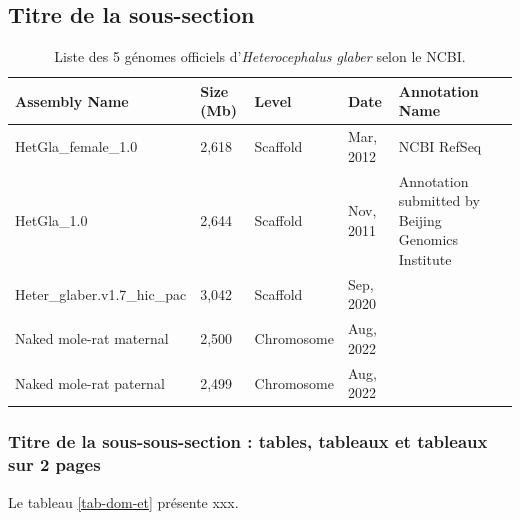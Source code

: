 \subsection{Titre de la sous-section}
\label{ajout-du-label-pour-faire-reference-a-la-sous-section}
 


\begin{table}[tb]%
    \raggedleft
    \caption{Liste des 5 génomes officiels d'\textit{Heterocephalus glaber} selon le NCBI.}
    \begin{tabular}{llllp{4cm}}
    \hline \hline
        \textbf{Assembly Name} & \textbf{Size (Mb)} & \textbf{Level} & \textbf{Date} & \textbf{Annotation Name} \\ \hline
        HetGla\_female\_1.0 & 2,618 & Scaffold & Mar, 2012 & NCBI RefSeq \\ \hline
       HetGla\_1.0 & 2,644 & Scaffold & Nov, 2011 & Annotation submitted by Beijing Genomics Institute \\ \hline
      Heter\_glaber.v1.7\_hic\_pac & 3,042 & Scaffold & Sep, 2020 & ~ \\ \hline
        Naked mole-rat maternal & 2,500 & Chromosome & Aug, 2022 & ~ \\ \hline
       Naked mole-rat paternal & 2,499 & Chromosome & Aug, 2022 & ~ \\ \hline \hline
    \end{tabular}
\end{table}


\subsubsection{Titre de la sous-sous-section : tables, tableaux et tableaux sur 2 pages}
Le tableau \ref{tab-dom-et} présente xxx.

\lipsum[60]

